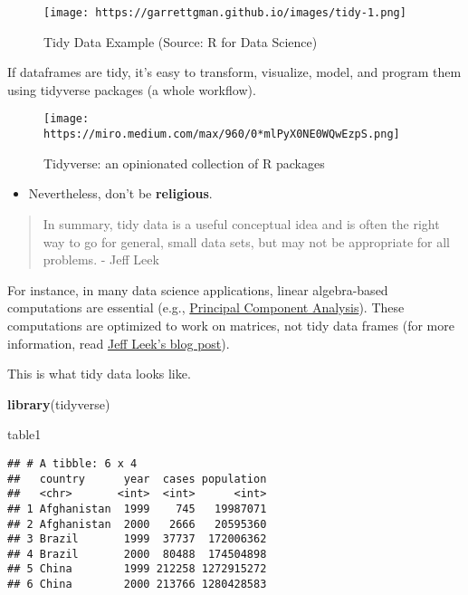 \documentclass[
]{book}
\newenvironment{Shaded}{\begin{snugshade}}{\end{snugshade}}
\newcommand{\KeywordTok}[1]{\textcolor[rgb]{0.13,0.29,0.53}{\textbf{#1}}}
\newcommand{\NormalTok}[1]{#1}
\providecommand{\tightlist}{%
  \setlength{\itemsep}{0pt}\setlength{\parskip}{0pt}}
\begin{document}
\begin{figure}
\centering
\texttt{[image: https://garrettgman.github.io/images/tidy-1.png]}
\caption{Tidy Data Example (Source: R for Data Science)}
\end{figure}

If dataframes are tidy, it's easy to transform, visualize, model, and program them using tidyverse packages (a whole workflow).

\begin{figure}
\centering
\texttt{[image: https://miro.medium.com/max/960/0*mlPyX0NE0WQwEzpS.png]}
\caption{Tidyverse: an opinionated collection of R packages}
\end{figure}

\begin{itemize}
\tightlist
\item
  Nevertheless, don't be \textbf{religious}.
\end{itemize}

\begin{quote}
In summary, tidy data is a useful conceptual idea and is often the right way to go for general, small data sets, but may not be appropriate for all problems. - Jeff Leek
\end{quote}

For instance, in many data science applications, linear algebra-based computations are essential (e.g., \href{https://www.math.upenn.edu/~kazdan/312S13/JJ/PCA-JJ.pdf}{Principal Component Analysis}). These computations are optimized to work on matrices, not tidy data frames (for more information, read \href{https://simplystatistics.org/2016/02/17/non-tidy-data/}{Jeff Leek's blog post}).

This is what tidy data looks like.

\begin{Shaded}
\begin{Highlighting}[]
\KeywordTok{library}\NormalTok{(tidyverse)}

\NormalTok{table1}
\end{Highlighting}
\end{Shaded}

\begin{verbatim}
## # A tibble: 6 x 4
##   country      year  cases population
##   <chr>       <int>  <int>      <int>
## 1 Afghanistan  1999    745   19987071
## 2 Afghanistan  2000   2666   20595360
## 3 Brazil       1999  37737  172006362
## 4 Brazil       2000  80488  174504898
## 5 China        1999 212258 1272915272
## 6 China        2000 213766 1280428583
\end{verbatim}
\end{document}

